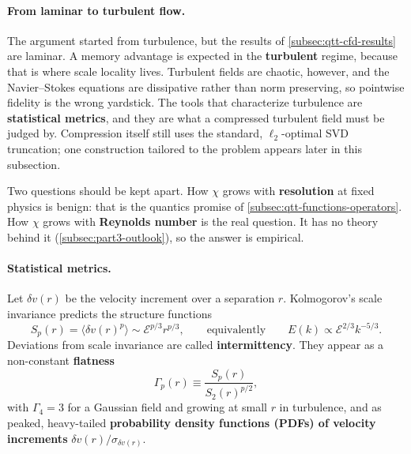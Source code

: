 \paragraph{From laminar to turbulent flow.}
The argument started from turbulence, but the results of
\cref{subsec:qtt-cfd-results} are laminar. A memory advantage is expected in the
\textbf{turbulent} regime, because that is where scale locality lives. Turbulent
fields are chaotic, however, and the Navier--Stokes equations are dissipative
rather than norm preserving, so pointwise fidelity is the wrong yardstick. The
tools that characterize turbulence are \textbf{statistical metrics}, and they are
what a compressed turbulent field must be judged by. Compression itself still
uses the standard, $\ell_2$-optimal SVD truncation; one construction tailored to
the problem appears later in this subsection.

Two questions should be kept apart. How $\chi$ grows with \textbf{resolution} at
fixed physics is benign: that is the quantics promise of
\cref{subsec:qtt-functions-operators}. How $\chi$ grows with \textbf{Reynolds
number} is the real question. It has no theory behind it
(\cref{subsec:part3-outlook}), so the answer is empirical.

\paragraph{Statistical metrics.}
Let $\delta v(r)$ be the velocity increment over a separation $r$.
Kolmogorov's scale invariance predicts the structure functions
\begin{equation}
  S_p(r) = \langle \delta v(r)^p \rangle \sim \mathcal{E}^{p/3} r^{p/3},
  \qquad\text{equivalently}\qquad
  E(k) \propto \mathcal{E}^{2/3} k^{-5/3}.
  \label{eq:structure-functions}
\end{equation}
Deviations from scale invariance are called \textbf{intermittency}. They appear
as a non-constant \textbf{flatness}
\begin{equation}
  \Gamma_p(r) \equiv \frac{S_p(r)}{S_2(r)^{p/2}},
  \label{eq:flatness}
\end{equation}
with $\Gamma_4 = 3$ for a Gaussian field and growing at small $r$ in
turbulence, and as peaked, heavy-tailed \textbf{probability density functions
(PDFs) of velocity increments} $\delta v(r)/\sigma_{\delta v(r)}$.

